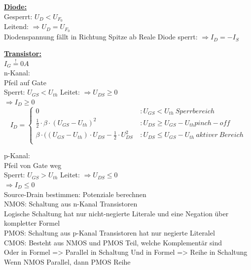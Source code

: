 \documentclass[11pt]{article}
\begin{document}
\newpage
\begin{minipage}{0.3\textwidth}

\underline{\textbf{Diode:}}\\
Gesperrt: $U_D < U_{F_0}$\\
Leitend: $\Rightarrow U_D = U_{F_0}$\\
Diodenspannung fällt in Richtung Spitze ab
Reale Diode sperrt: $\Rightarrow I_D = -I_S$

\underline{\textbf{Transistor:}}\\
$I_G \stackrel{!}{=} 0A$\\
n-Kanal:\\
\phantom{ss} Pfeil auf Gate\\
\phantom{ss} Sperrt: $U_{GS} < U_{th}$
\phantom{ss} Leitet: $\Rightarrow U_{DS} \geq 0$\\
\phantom{sssssisisssi}$\Rightarrow I_D \geq 0$\\

\[I_D = \left\{
  \begin{array}{lr}
    0 & : U_{GS} < U_{th}~Sperrbereich\\
    \frac{1}{2} \cdot \beta \cdot(U_{GS} - U_{th})^2  \ & : U_{DS} \ge U_{GS} - U_{th} pinch-off\\
       \beta \cdot((U_{GS} - U_{th}) \cdot U_{DS} - \frac{1}{2} \cdot U_{DS}^2  \ & : U_{DS} \leq U_{GS} - U_{th}~aktiver~Bereich\\
  \end{array}
\right.
\]

p-Kanal:\\
\phantom{ss} Pfeil von Gate weg\\
\phantom{ss} Sperrt: $U_{GS} > U_{th}$
\phantom{ss} Leitet: $\Rightarrow U_{DS} \leq 0$\\
\phantom{sssssisisssi}$\Rightarrow I_D \leq 0$\\

Source-Drain bestimmen: Potenziale berechnen\\
NMOS: Schaltung aus n-Kanal Transistoren\\
\phantom{ss} Logische Schaltung hat nur nicht-negierte Literale und eine Negation über kompletter Formel\\
PMOS: Schaltung aus p-Kanal Transistoren hat nur negierte Literalel\\
CMOS: Besteht aus NMOS und PMOS Teil, welche Komplementär sind\\
Oder in Formel => Parallel in Schaltung
Und in Formel => Reihe in Schaltung
\phantom{ss} Wenn NMOS Parallel, dann PMOS Reihe\\
\end{minipage}%

\end{document}
